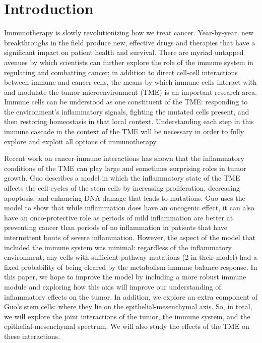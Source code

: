 \documentclass{article}
\begin{document}
\section{Introduction}
Immunotherapy is slowly revolutionizing how we treat cancer.
Year-by-year, new breakthroughs in the field produce new, effective drugs and therapies that have a significant impact on patient health and survival\cite{pardoll2012blockade}\cite{restifo2012adoptive}.
There are myriad untapped avenues by which scientists can further explore the role of the immune system in regulating and combatting cancer; in addition to direct cell-cell interactions between immune and cancer cells, the means by which immune cells interact with and modulate the tumor microenvironment (TME) is an important research area. Immune cells can be understood as one constituent of the TME: responding to the environment's inflammatory signals, fighting the mutated cells present, and then restoring homeostasis in that local context\cite{de2006paradoxical}.
Understanding each step in this immune cascade in the context of the TME will be necessary in order to fully explore and exploit all options of immunotherapy.

Recent work on cancer-immune interactions has shown that the inflammatory conditions of the TME can play large and sometimes surprising roles in tumor growth.
Guo describes a model in which the inflammatory state of the TME affects the cell cycles of the stem cells by increasing proliferation, decreasing apoptosis, and enhancing DNA damage that leads to mutations\cite{guo2017multiscale}.
Guo uses the model to show that while inflammation does have an oncogenic effect, it can also have an onco-protective role as periods of mild inflammation are better at preventing cancer than periods of no inflammation in patients that have intermittent bouts of severe inflammation.
However, the aspect of the model that included the immune system was minimal: regardless of the inflammatory environment, any cells with sufficient pathway mutations (2 in their model) had a fixed probability of being cleared by the metabolism-immune balance response. 
In this paper, we hope to improve the model by including a more robust immune module and exploring how this axis will improve our understanding of inflammatory effects on the tumor.
In addition, we explore an extra component of Guo's stem cells: where they lie on the epithelial-mesenchymal axis.
So, in total, we will explore the joint interactions of the tumor, the immune system, and the epithelial-mesenchymal spectrum.
We will also study the effects of the TME on these interactions.
\end{document}
